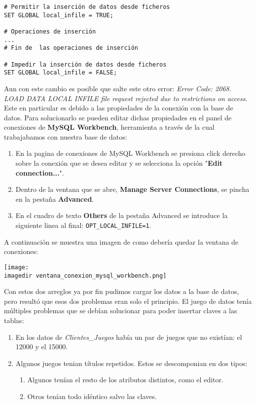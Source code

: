 \documentclass[a4paper, 11pt, oneside]{article} %
\newcommand{\imagedir}{../images/} %
\begin{document}
\begin{verbatim}
# Permitir la inserción de datos desde ficheros
SET GLOBAL local_infile = TRUE;

# Operaciones de inserción
...
# Fin de  las operaciones de inserción

# Impedir la inserción de datos desde ficheros
SET GLOBAL local_infile = FALSE;
\end{verbatim}

Aun con este cambio es posible que salte este otro error: \emph{Error Code: 2068. LOAD DATA LOCAL INFILE file request rejected due to restrictions on access}. Este en particular es debido a las propiedades de la conexión con la base de datos. Para solucionarlo se pueden editar dichas propiedades en el panel de conexiones de \textbf{MySQL Workbench}, herramienta a través de la cual trabajabamos con nuestra base de datos:

\begin{enumerate}
	\item En la pagina de conexiones de MySQL Workbench se presiona click derecho sobre la conexión que se desea editar y se selecciona la opción "\textbf{Edit connection...}".
	\item Dentro de la ventana que se abre, \textbf{Manage Server Connections}, se pincha en la pestaña \textbf{Advanced}.
	\item En el cuadro de texto \textbf{Others} de la pestaña Advanced se introduce la siguiente linea al final: \texttt{OPT_LOCAL_INFILE=1}.
\end{enumerate}

A continuación se muestra una imagen de como debería quedar la ventana de conexiones:

\texttt{[image: \\imagedir ventana\_conexion\_mysql\_workbench.png]}

Con estos dos arreglos ya por fin pudimos cargar los datos a la base de datos, pero resultó que esos dos problemas eran solo el principio. El juego de datos tenía múltiples problemas que se debían solucionar para poder insertar claves a las tablas:

\begin{enumerate}
	\item En los datos de \emph{Clientes\_Juegos} había un par de juegos que no existían: el 12000 y el 15000.

	\item Algunos juegos tenian títulos repetidos. Estos se descomponian en dos tipos:
	\begin{enumerate}
		\item Algunos tenían el resto de los atributos distintos, como el editor.
		\item Otros tenían todo idéntico salvo las claves.
	\end{enumerate}
\end{enumerate}
\end{document}
